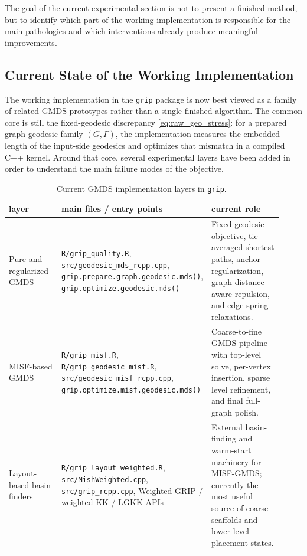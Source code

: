 \documentclass[twoside,11pt]{article}
\begin{document}
The goal of the current experimental section is not to present a finished
method, but to identify which part of the working implementation is
responsible for the main pathologies and which interventions already produce
meaningful improvements.

\subsection{Current State of the Working Implementation}
\label{sec:current_implementation}

The working implementation in the \texttt{grip} package is now best viewed as
a family of related GMDS prototypes rather than a single finished algorithm.
The common core is still the fixed-geodesic discrepancy
\cref{eq:raw_geo_stress}: for a prepared graph-geodesic family
$(G,\Gamma)$, the implementation measures the embedded length of the
input-side geodesics and optimizes that mismatch in a compiled C++ kernel.
Around that core, several experimental layers have been added in order to
understand the main failure modes of the objective.

\begin{table}[t]
  \centering
  \small
  \caption{Current GMDS implementation layers in \texttt{grip}.}
  \label{tab:implementation_layers}
  \begin{tabular}{p{0.23\linewidth} p{0.34\linewidth} p{0.35\linewidth}}
    \toprule
    layer & main files / entry points & current role \\
    \midrule
    Pure and regularized GMDS &
    \texttt{R/grip\_quality.R},
    \texttt{src/geodesic\_mds\_rcpp.cpp},
    \texttt{grip.prepare.graph.geodesic.mds()},
    \texttt{grip.optimize.geodesic.mds()} &
    Fixed-geodesic objective, tie-averaged shortest paths, anchor regularization, graph-distance-aware repulsion, and edge-spring relaxations. \\
    \addlinespace
    MISF-based GMDS &
    \texttt{R/grip\_misf.R},
    \texttt{R/grip\_geodesic\_misf.R},
    \texttt{src/geodesic\_misf\_rcpp.cpp},
    \texttt{grip.optimize.misf.geodesic.mds()} &
    Coarse-to-fine GMDS pipeline with top-level solve, per-vertex insertion, sparse level refinement, and final full-graph polish. \\
    \addlinespace
    Layout-based basin finders &
    \texttt{R/grip\_layout\_weighted.R},
    \texttt{src/MishWeighted.cpp},
    \texttt{src/grip\_rcpp.cpp},
    Weighted GRIP / weighted KK / LGKK APIs &
    External basin-finding and warm-start machinery for MISF-GMDS; currently the most useful source of coarse scaffolds and lower-level placement states. \\
    \bottomrule
  \end{tabular}
\end{table}
\end{document}
